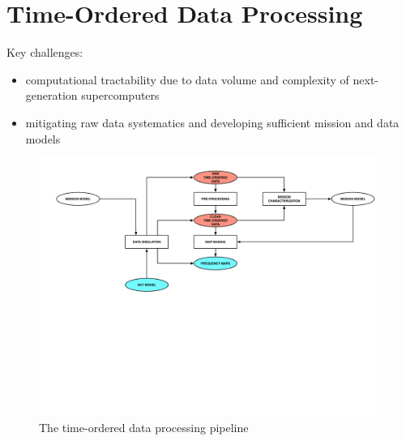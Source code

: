  
\section{Time-Ordered Data Processing}

Key challenges:
\begin{itemize}
\item computational tractability due to data volume and complexity of next-generation supercomputers
\item mitigating raw data systematics and developing sufficient mission and data models
\end{itemize}

\begin{figure}[htbp]
\centering
\includegraphics[width=1\textwidth]{Analysis/tod}
\caption{The time-ordered data processing pipeline}
\label{default}

\end{figure}
%



